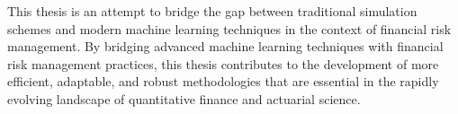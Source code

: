 This thesis is an attempt to bridge the gap between traditional simulation schemes and modern machine learning techniques in the context of financial risk management.
By bridging advanced machine learning techniques with financial risk management practices, this thesis contributes to the development of more efficient, adaptable, and robust methodologies that are essential in the rapidly evolving landscape of quantitative finance and actuarial science.

